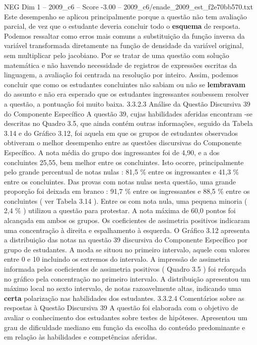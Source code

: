 \begin{textsample}{NEG Dim 1 – 2009\_c6 – Score -3.00 – 2009\_c6/enade\_2009\_est\_f2e70bb570.txt}
Este desempenho se aplicou principalmente porque a questão não tem avaliação parcial, de vez que o estudante deveria concluir todo o \textbf{esquema} de resposta.
Podemos ressaltar como erros mais comuns a substituição da função inversa da variável transformada diretamente na função de densidade da variável original, sem multiplicar pelo jacobiano.
Por se tratar de uma questão com solução matemática e não havendo necessidade de registros de expressões escritas da linguagem, a avaliação foi centrada na resolução por inteiro.
Assim, podemos concluir que como os estudantes concluintes não sabiam ou não se \textbf{lembravam} do assunto e não era esperado que os estudantes ingressantes soubessem resolver a questão, a pontuação foi muito baixa. 3.3.2.3 Análise da Questão Discursiva 39 do Componente Específico A questão 39, cujas habilidades aferidas encontram -se descritas no Quadro 3.5, que ainda contém outras informações, seguido da Tabela 3.14 e do Gráfico 3.12, foi aquela em que os grupos de estudantes observados obtiveram o melhor desempenho entre as questões discursivas do Componente Específico.
A nota média do grupo dos ingressantes foi de 4,90, e a dos concluintes 25,55, bem melhor entre os concluintes.
Isto ocorre, principalmente pelo grande percentual de notas nulas : 81,5 \% entre os ingressantes e 41,3 \% entre os concluintes.
Das provas com notas nulas nesta questão, uma grande proporção foi deixada em branco : 91,7 \% entre os ingressantes e 88,5 \% entre os concluintes ( ver Tabela 3.14 ).
Entre os com nota nula, uma pequena minoria ( 2,4 \% ) utilizou a questão para protestar.
A nota máxima de 60,0 pontos foi alcançada em ambos os grupos.
Os coeficientes de assimetria positivos indicaram uma concentração à direita e espalhamento à esquerda.
O Gráfico 3.12 apresenta a distribuição das notas na questão 39 discursiva do Componente Específico por grupo de estudantes.
A moda se situou no primeiro intervalo, aquele com valores entre 0 e 10 incluindo os extremos do intervalo.
A impressão de assimetria informada pelos coeficientes de assimetria positivos ( Quadro 3.5 ) foi reforçada no gráfico pela concentração no primeiro intervalo.
A distribuição apresentou um máximo local no sexto intervalo, de notas razoavelmente altas, indicando uma \textbf{certa} polarização nas habilidades dos estudantes. 3.3.2.4 Comentários sobre as respostas à Questão Discursiva 39 A questão foi elaborada com o objetivo de avaliar o conhecimento dos estudantes sobre testes de hipóteses.
Apresentou um grau de dificuldade mediano em função da escolha do conteúdo predominante e em relação às habilidades e competências aferidas.

\end{textsample}
